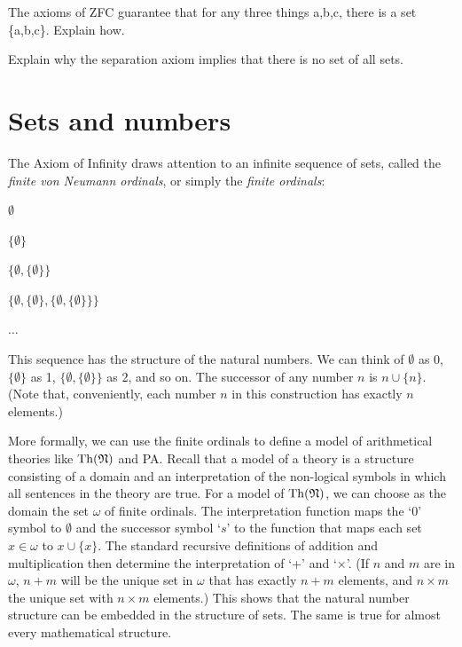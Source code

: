 \begin{exercise}
  The axioms of ZFC guarantee that for any three things a,b,c, there is a set \{a,b,c\}.
  Explain how.
\end{exercise}

\begin{exercise}
  Explain why the separation axiom implies that there is no set of all sets.
\end{exercise}


\section{Sets and numbers}\label{sec:ordinals}

The Axiom of Infinity draws attention to an infinite sequence of sets,
called the \emph{finite von Neumann ordinals},
or simply the \emph{finite ordinals}:

\begin{itemize*}
  \item $\emptyset$
  \item $\{ \emptyset \}$
  \item $\{ \emptyset, \{ \emptyset \} \}$
  \item $\{ \emptyset, \{ \emptyset \}, \{ \emptyset, \{ \emptyset \} \} \}$
  \item $\ldots$
\end{itemize*}
%
\noindent%
This sequence has the structure of the natural numbers.
We can think of $\emptyset$ as 0,
$\{ \emptyset \}$ as 1,
$\{ \emptyset, \{ \emptyset \} \}$ as 2,
and so on.
The successor of any number $n$ is $n \cup \{ n \}$.
(Note that,
conveniently,
each number $n$ in this construction has exactly $n$ elements.)

More formally,
we can use the finite ordinals to
define a model of arithmetical theories like $\mathrm{Th}(\mathfrak{N})$ and PA.
Recall that a model of a theory is
a structure consisting of a domain and an interpretation of the non-logical symbols
in which all sentences in the theory are true.
For a model of $\mathrm{Th}(\mathfrak{N})$,
we can choose as the domain the set $\omega$ of finite ordinals.
The interpretation function
maps the `0' symbol to $\emptyset$
and the successor symbol `$s$' to
the function that maps each set $x \in \omega$ to $x \cup \{ x \}$.
The standard recursive definitions of addition and multiplication
then determine the interpretation of `+' and `$\times$'.
(If $n$ and $m$ are in $\omega$,
$n + m$ will be the unique set in $\omega$ that
has exactly $n+m$ elements,
and $n \times m$ the unique set with $n \times m$ elements.)
This shows that the natural number structure can be embedded in the structure of sets.
The same is true for almost every mathematical structure.

